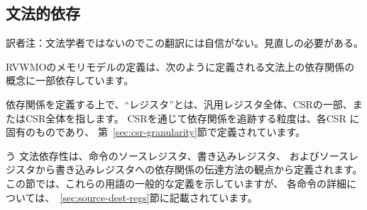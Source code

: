\subsection*{文法的依存}
\begin{commentary}
訳者注：文法学者ではないのでこの翻訳には自信がない。見直しの必要がある。
\end{commentary}
\label{sec:memorymodel:dependencies}

\begin{comment}
The definition of the RVWMO memory model depends in part on the notion of a syntactic dependency, defined as follows.
\end{comment}

RVWMOのメモリモデルの定義は、次のように定義される文法上の依存関係の概念に一部依存しています。

\begin{comment}
In the context of defining dependencies, a ``register'' refers either to an entire general-purpose register, some portion of a CSR, or an entire CSR.  The granularity at which dependencies are tracked through CSRs is specific to each CSR and is defined in Section~\ref{sec:csr-granularity}.
\end{comment}

依存関係を定義する上で、``レジスタ''とは、汎用レジスタ全体、CSRの一部、またはCSR全体を指します。
CSRを通じて依存関係を追跡する粒度は、各CSR に固有のものであり、
第~\ref{sec:csr-granularity}節で定義されています。

\begin{comment}
Syntactic dependencies are defined in terms of instructions' {\em source registers}, instructions' {\em destination registers}, and the way instructions {\em carry a dependency} from their source registers to their destination registers.
This section provides a general definition of all of these terms; however, Section~\ref{sec:source-dest-regs} provides a complete listing of the specifics for each instruction.
\end{comment}	う
文法依存性は、命令のソースレジスタ、書き込みレジスタ、
およびソースレジスタから書き込みレジスタへの依存関係の伝達方法の観点から定義されます。
この節では、これらの用語の一般的な定義を示していますが、
各命令の詳細については、~\ref{sec:source-dest-regs}節に記載されています。

